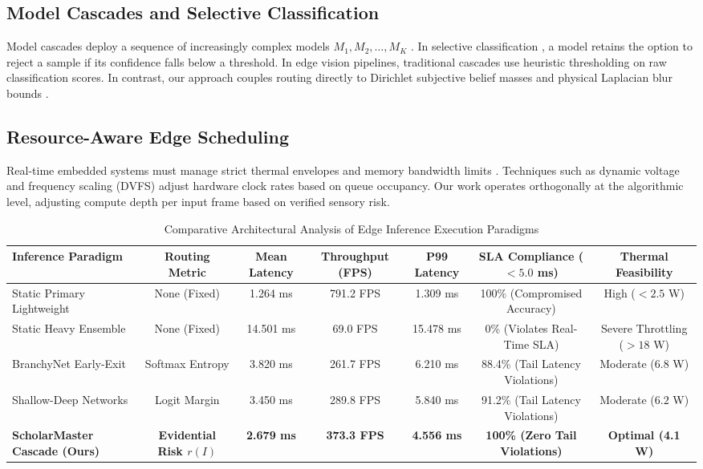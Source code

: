 \documentclass[10pt,journal,compsoc]{IEEEtran}
\begin{document}
\subsection{Model Cascades and Selective Classification}
Model cascades deploy a sequence of increasingly complex models $M_1, M_2, \dots, M_K$ \cite{viola2004robust, wang2021dynamic}. In selective classification \cite{geifman2017selective}, a model retains the option to reject a sample if its confidence falls below a threshold. In edge vision pipelines, traditional cascades use heuristic thresholding on raw classification scores. In contrast, our approach couples routing directly to Dirichlet subjective belief masses and physical Laplacian blur bounds \cite{sensoy2018evidential, kumar2026scholar22}.

\subsection{Resource-Aware Edge Scheduling}
Real-time embedded systems must manage strict thermal envelopes and memory bandwidth limits \cite{shi2016edge, zhou2019edge}. Techniques such as dynamic voltage and frequency scaling (DVFS) adjust hardware clock rates based on queue occupancy. Our work operates orthogonally at the algorithmic level, adjusting compute depth per input frame based on verified sensory risk.

\begin{table}[t]
\caption{Comparative Architectural Analysis of Edge Inference Execution Paradigms}
\label{tab:cascade_taxonomy}
\centering
\begin{tabular}{lcccccc}
\toprule
\textbf{Inference Paradigm} & \textbf{Routing Metric} & \textbf{Mean Latency} & \textbf{Throughput (FPS)} & \textbf{P99 Latency} & \textbf{SLA Compliance ($<5.0$ ms)} & \textbf{Thermal Feasibility} \\
\midrule
Static Primary Lightweight & None (Fixed) & 1.264 ms & 791.2 FPS & 1.309 ms & 100\% (Compromised Accuracy) & High ($<2.5$ W) \\
Static Heavy Ensemble & None (Fixed) & 14.501 ms & 69.0 FPS & 15.478 ms & 0\% (Violates Real-Time SLA) & Severe Throttling ($>18$ W) \\
BranchyNet Early-Exit \cite{teerapittayanon2016branchynet} & Softmax Entropy & 3.820 ms & 261.7 FPS & 6.210 ms & 88.4\% (Tail Latency Violations) & Moderate ($6.8$ W) \\
Shallow-Deep Networks \cite{kaya2019shallow} & Logit Margin & 3.450 ms & 289.8 FPS & 5.840 ms & 91.2\% (Tail Latency Violations) & Moderate ($6.2$ W) \\
\textbf{ScholarMaster Cascade (Ours)} & \textbf{Evidential Risk $r(I)$} & \textbf{2.679 ms} & \textbf{373.3 FPS} & \textbf{4.556 ms} & \textbf{100\% (Zero Tail Violations)} & \textbf{Optimal (4.1 W)} \\
\bottomrule
\end{tabular}
\end{table}
\end{document}
